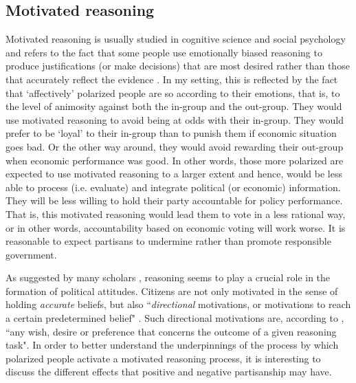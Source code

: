 \documentclass[a4paper, svgnames]{article}
\begin{document}
\subsection{Motivated reasoning}

Motivated reasoning is usually studied in cognitive science and social psychology and refers to the fact that some people use emotionally biased reasoning to produce justifications (or make decisions) that are most desired rather than those that accurately reflect the evidence \citep{Kunda1990}. In my setting, this is reflected by the fact that `affectively' polarized people are so according to their emotions, that is, to the level of animosity against both the in-group and the out-group. They would use motivated reasoning to avoid being at odds with their in-group. They would prefer to be `loyal' to their in-group than to punish them if economic situation goes bad. Or the other way around, they would avoid rewarding their out-group when economic performance was good. In other words, those more polarized are expected to use motivated reasoning to a larger extent and hence, would be less able to process (i.e. evaluate) and integrate political (or economic) information. They will be less willing to hold their party accountable for policy performance. That is, this motivated reasoning would lead them to vote in a less rational way, or in other words, accountability based on economic voting will work worse. It is reasonable to expect partisans to undermine rather than promote responsible government.

As suggested by many scholars \citep{Taber2006, Boyer}, reasoning seems to play a crucial role in the formation of political attitudes. Citizens are not only motivated in the sense of holding \textit{accurate} beliefs, but also ``\textit{directional} motivations, or motivations to reach a certain predetermined belief" \citep[p.2]{Boyer}. Such directional motivations are, according to \cite[p. 440]{Kunda1990}, ``any wish, desire or preference that concerns the outcome of a given reasoning task". In order to better understand the underpinnings of the process by which polarized people activate a motivated reasoning process, it is interesting to discuss the different effects that positive and negative partisanship may have.
\end{document}

